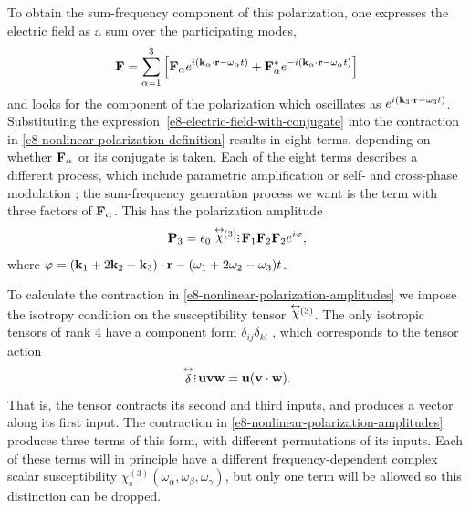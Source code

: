 To obtain the sum-frequency component of this polarization, one expresses the electric field as a sum over the participating modes, 
\begin{equation}
  \vb{F}=\sum_{\alpha=1}^3\left[
  \vb{F}_\alpha e^{i(\vb{k}_\alpha\cdot \vb{r}-\omega_\alpha t)}
  +
  \vb{F}_\alpha^\ast e^{-i(\vb{k}_\alpha\cdot \vb{r}-\omega_\alpha t)}
  \right]
  \label{e8-electric-field-with-conjugate}
\end{equation}
and looks for the component of the polarization which oscillates as $e^{i(\vb{k}_3\cdot\vb{r}-\omega_3 t)}$. Substituting the expression~\eqref{e8-electric-field-with-conjugate} into the contraction in \eqref{e8-nonlinear-polarization-definition} results in eight terms, depending on whether $\vb{F}_\alpha$ or its conjugate is taken. Each of the eight terms describes a different process, which include parametric amplification or self- and cross-phase modulation \cite{AgrawalFiberOptics}; the sum-frequency generation process we want is the term with three factors of  $\vb{F}_\alpha$. This has the polarization amplitude
\begin{equation}
\vbP_3=\epsilon_0\chit
\tdots
\vbf_1\vbf_2\vbf_2 e^{i\varphi},
\label{e8-nonlinear-polarization-amplitudes}
\end{equation}
where $\varphi=(\vb{k}_1+2\vb{k}_2-\vb{k}_3)\cdot\vb{r}-(\omega_1+2\omega_2-\omega_3)t$.




To calculate the contraction in \eqref{e8-nonlinear-polarization-amplitudes} we impose the isotropy condition on the susceptibility tensor $\stackrel{\leftrightarrow}{\chi}\!\!{}^{(3)}$. The only isotropic tensors of rank 4 have a component form $\delta_{ij}\delta_{kl}$ \cite[\S3.03]{JeffreysJeffreys}, which corresponds to the tensor action 
\begin{equation}
\stackrel{\leftrightarrow}{\delta}\, \,\tdots\vb{u}\vb{v}\vb{w}=\vb{u}(\vb{v}\cdot\vb{w}).
\end{equation}
That is, the tensor contracts its second and third inputs, and produces a vector along its first input. The contraction in \eqref{e8-nonlinear-polarization-amplitudes} produces three terms of this form, with different permutations of its inputs. Each of these terms will in principle have a different frequency-dependent complex scalar susceptibility $\chi^{(3)}_\text{s}(\omega_\alpha,\omega_\beta,\omega_\gamma)$, but only one term will be allowed so this distinction can be dropped.





